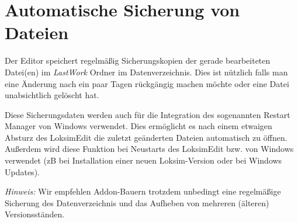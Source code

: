 \section{Automatische Sicherung von Dateien}
\label{sec:editor-lastwork}
Der Editor speichert regelmäßig Sicherungskopien der gerade bearbeiteten Datei(en) im \emph{LastWork} Ordner im Datenverzeichnis. Dies ist nützlich falls man eine Änderung nach ein paar Tagen rückgängig machen möchte oder eine Datei unabsichtlich gelöscht hat.

Diese Sicherungsdaten werden auch für die Integration des sogenannten Restart Manager von Windows verwendet. Dies ermöglicht es nach einem etwaigen Absturz des LoksimEdit die zuletzt geänderten Dateien automatisch zu öffnen. Außerdem wird diese Funktion bei Neustarts des LoksimEdit bzw. von Windows verwendet (zB bei Installation einer neuen Loksim-Version oder bei Windows Updates).

\emph{Hinweis:} Wir empfehlen Addon-Bauern trotzdem unbedingt eine regelmäßige Sicherung des Datenverzeichnis und das Aufheben von mehreren (älteren) Versionsständen. 